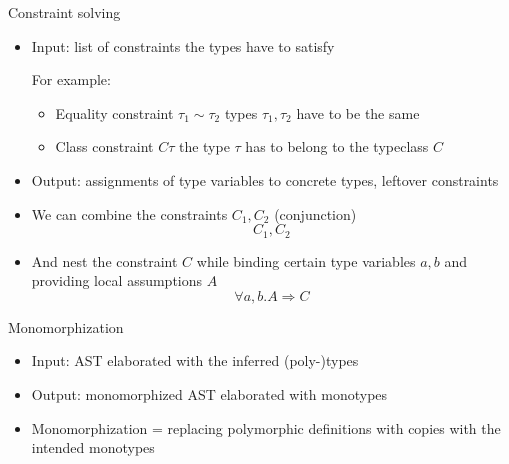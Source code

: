 \documentclass[aspectratio=169]{beamer}
\begin{document}
\begin{frame}{Constraint solving}
  \begin{itemize}
    \item[\faSignIn] Input: list of constraints the types have to satisfy
    
    For example:
    \begin{itemize}
      \item Equality constraint $\tau_1 \sim \tau_2$ \hfill types $\tau_1, \tau_2$ have to be the same
      \item Class constraint $C \tau$ \hfill the type $\tau$ has to belong to the typeclass $C$ 
    \end{itemize} 
    \item[\faSignOut] Output: assignments of type variables to concrete types, leftover constraints
    \item We can combine the constraints $C_1, C_2$ (conjunction) $$C_1, C_2$$
    \item And nest the constraint $C$ while binding certain type variables $a, b$ and providing local assumptions $A$ $$\forall a, b . A \Rightarrow C$$
  \end{itemize}
\end{frame}

\begin{frame}{Monomorphization}
  \begin{itemize}
    \item[\faSignIn] Input: AST elaborated with the inferred (poly-)types
    \item[\faSignOut] Output: monomorphized AST elaborated with monotypes
    \item {\color{green!80!black} Mono}morphization = replacing {\color{orange} poly}morphic definitions with copies with the intended {\color{green!80!black} mono}types
  \end{itemize}
\end{frame}
\end{document}
